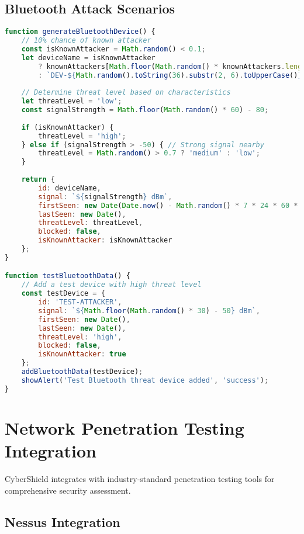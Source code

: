 \documentclass[12pt,a4paper]{report}
\begin{document}
\subsection{Bluetooth Attack Scenarios}

\begin{lstlisting}[language=JavaScript,caption={Bluetooth Device Threat Generator}]
function generateBluetoothDevice() {
    // 10% chance of known attacker
    const isKnownAttacker = Math.random() < 0.1;
    let deviceName = isKnownAttacker 
        ? knownAttackers[Math.floor(Math.random() * knownAttackers.length)]
        : `DEV-${Math.random().toString(36).substr(2, 6).toUpperCase()}`;
    
    // Determine threat level based on characteristics
    let threatLevel = 'low';
    const signalStrength = Math.floor(Math.random() * 60) - 80;
    
    if (isKnownAttacker) {
        threatLevel = 'high';
    } else if (signalStrength > -50) { // Strong signal nearby
        threatLevel = Math.random() > 0.7 ? 'medium' : 'low';
    }
    
    return {
        id: deviceName,
        signal: `${signalStrength} dBm`,
        firstSeen: new Date(Date.now() - Math.random() * 7 * 24 * 60 * 60 * 1000),
        lastSeen: new Date(),
        threatLevel: threatLevel,
        blocked: false,
        isKnownAttacker: isKnownAttacker
    };
}

function testBluetoothData() {
    // Add a test device with high threat level
    const testDevice = {
        id: 'TEST-ATTACKER',
        signal: `${Math.floor(Math.random() * 30) - 50} dBm`,
        firstSeen: new Date(),
        lastSeen: new Date(),
        threatLevel: 'high',
        blocked: false,
        isKnownAttacker: true
    };
    addBluetoothData(testDevice);
    showAlert('Test Bluetooth threat device added', 'success');
}
\end{lstlisting}

\section{Network Penetration Testing Integration}

CyberShield integrates with industry-standard penetration testing tools for comprehensive security assessment.

\subsection{Nessus Integration}
\end{document}
